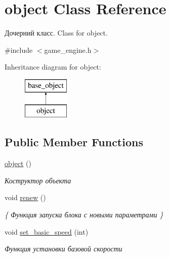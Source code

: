 \hypertarget{classobject}{}\section{object Class Reference}
\label{classobject}


Дочерний класс. Class for object.  




{\ttfamily \#include $<$game\+\_\+engine.\+h$>$}

Inheritance diagram for object\+:\begin{figure}[H]
\begin{center}
\leavevmode
\includegraphics[height=2.000000cm]{classobject}
\end{center}
\end{figure}
\subsection*{Public Member Functions}
\begin{DoxyCompactItemize}
\item 
\mbox{\label{classobject_a04aad740887b47c735b9ed9078e45d77}} 
\mbox{\hyperlink{classobject_a04aad740887b47c735b9ed9078e45d77}{object}} ()
\begin{DoxyCompactList}\small\item\em Коструктор объекта \end{DoxyCompactList}\item 
\mbox{\label{classobject_a2fe455d0f7b85018d2984888cbef18b8}} 
void \mbox{\hyperlink{classobject_a2fe455d0f7b85018d2984888cbef18b8}{renew}} ()
\begin{DoxyCompactList}\small\item\em \{ Функция запуска блока с новыми параметрами \} \end{DoxyCompactList}\item 
void \mbox{\hyperlink{classobject_a8a93112d56c32430e1eb5560d2db6912}{set\+\_\+basic\+\_\+speed}} (int)
\begin{DoxyCompactList}\small\item\em Функция установки базовой скорости \end{DoxyCompactList}\end{DoxyCompactItemize}
